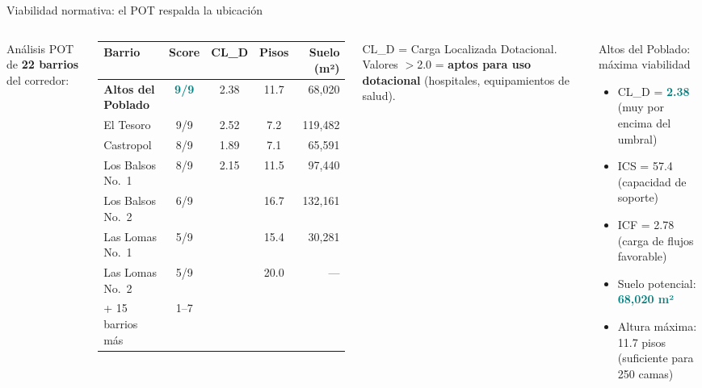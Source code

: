 \documentclass[aspectratio=169, 11pt]{beamer}
\newcommand{\highlight}[1]{\textcolor{teal}{\textbf{#1}}}
\newcommand{\src}[1]{\par\vspace{2pt}{\tiny\textcolor{slate}{Fuente: #1}}}
\begin{document}
\begin{frame}{Viabilidad normativa: el POT respalda la ubicación}

\begin{columns}[T]
Análisis POT de \textbf{22 barrios} del corredor:

\vspace{6pt}
{\scriptsize
\begin{tabular}{@{}lcccr@{}}
\toprule
\textbf{Barrio} & \textbf{Score} & \textbf{CL\_D} & \textbf{Pisos} & \textbf{Suelo (m²)} \\
\midrule
\rowcolor{teal!10}
\textbf{Altos del Poblado} & \highlight{9/9} & 2.38 & 11.7 & 68,020 \\
\rowcolor{teal!6}
El Tesoro & 9/9 & 2.52 & 7.2 & 119,482 \\
Castropol & 8/9 & 1.89 & 7.1 & 65,591 \\
Los Balsos No.\ 1 & 8/9 & 2.15 & 11.5 & 97,440 \\
\midrule
Los Balsos No.\ 2 & 6/9 & & 16.7 & 132,161 \\
Las Lomas No.\ 1 & 5/9 & & 15.4 & 30,281 \\
Las Lomas No.\ 2 & 5/9 & & 20.0 & --- \\
\midrule
{\tiny + 15 barrios más} & 1--7 & & & \\
\bottomrule
\end{tabular}
}

\vspace{3pt}
\src{POT Batería Indicadores (3ciz-tpgr), Acuerdo 48 de 2014}

\vspace{4pt}
{\footnotesize CL\_D = Carga Localizada Dotacional. Valores $>$2.0 = \textbf{aptos para uso dotacional} (hospitales, equipamientos de salud).}

\begin{exampleblock}{\small Altos del Poblado: máxima viabilidad}
\footnotesize
\begin{itemize}
  \item CL\_D = \highlight{2.38} (muy por encima del umbral)
  \item ICS = 57.4 (capacidad de soporte)
  \item ICF = 2.78 (carga de flujos favorable)
  \item Suelo potencial: \highlight{68,020 m²}
  \item Altura máxima: 11.7 pisos (suficiente para 250 camas)
\end{itemize}
\end{exampleblock}


\end{columns}
\end{frame}
\end{document}

